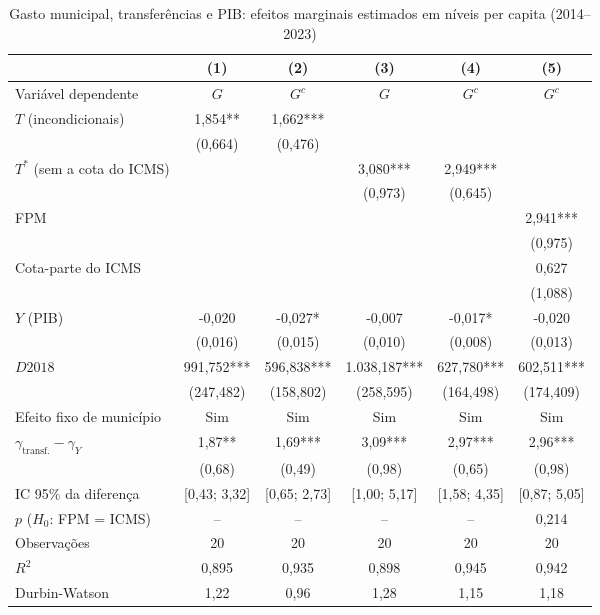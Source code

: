 \begin{table}[H]
\centering\footnotesize
\setlength{\tabcolsep}{4pt}
\caption{Gasto municipal, transferências e PIB: efeitos marginais estimados em níveis per capita (2014--2023)}
\label{tab:regressao}
\begin{adjustbox}{max width=\textwidth}
\begin{tabular}{lccccc}
\toprule
 & (1) & (2) & (3) & (4) & (5) \\
\midrule
Variável dependente & $G$ & $G^{c}$ & $G$ & $G^{c}$ & $G^{c}$ \\
\midrule
$T$ (incondicionais) & 1,854** & 1,662*** &  &  &  \\
 & (0,664) & (0,476) &  &  &  \\
$T^{*}$ (sem a cota do ICMS) &  &  & 3,080*** & 2,949*** &  \\
 &  &  & (0,973) & (0,645) &  \\
FPM &  &  &  &  & 2,941*** \\
 &  &  &  &  & (0,975) \\
Cota-parte do ICMS &  &  &  &  & 0,627 \\
 &  &  &  &  & (1,088) \\
$Y$ (PIB) & -0,020 & -0,027* & -0,007 & -0,017* & -0,020 \\
 & (0,016) & (0,015) & (0,010) & (0,008) & (0,013) \\
$D2018$ & 991,752*** & 596,838*** & 1.038,187*** & 627,780*** & 602,511*** \\
 & (247,482) & (158,802) & (258,595) & (164,498) & (174,409) \\
\midrule
Efeito fixo de município & Sim & Sim & Sim & Sim & Sim \\
$\gamma_{\text{transf.}} - \gamma_Y$ & 1,87** & 1,69*** & 3,09*** & 2,97*** & 2,96*** \\
 & (0,68) & (0,49) & (0,98) & (0,65) & (0,98) \\
IC 95\% da diferença & [0,43; 3,32] & [0,65; 2,73] & [1,00; 5,17] & [1,58; 4,35] & [0,87; 5,05] \\
$p$ ($H_0$: FPM = ICMS) & -- & -- & -- & -- & 0,214 \\
Observações & 20 & 20 & 20 & 20 & 20 \\
$R^2$ & 0,895 & 0,935 & 0,898 & 0,945 & 0,942 \\
Durbin-Watson & 1,22 & 0,96 & 1,28 & 1,15 & 1,18 \\
\bottomrule
\end{tabular}
\end{adjustbox}

\end{table}
